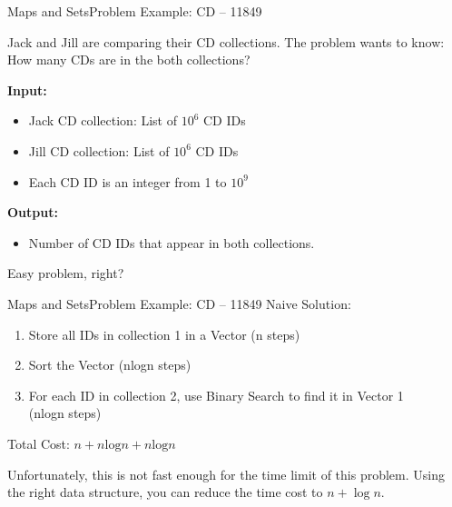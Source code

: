 \begin{frame}{Maps and Sets}{Problem Example: CD -- 11849}

  Jack and Jill are comparing their CD collections. The problem wants to know: How many CDs are in the both collections?\bigskip

  \begin{block}{}
    {\bf Input:}
    \begin{itemize}
    \item Jack CD collection: List of $10^6$ CD IDs
    \item Jill CD collection: List of $10^6$ CD IDs
    \item Each CD ID is an integer from 1 to $10^9$
    \end{itemize}

    {\bf Output:}
    \begin{itemize}
    \item Number of CD IDs that appear in both collections.
    \end{itemize}

  \end{block}
  \bigskip

  Easy problem, right?
\end{frame}

\begin{frame}{Maps and Sets}{Problem Example: CD -- 11849}
  Naive Solution:
  \bigskip

  \begin{enumerate}
  \item Store all IDs in collection 1 in a Vector \hfill (n steps)
  \item Sort the Vector \hfill (nlogn steps)
  \item For each ID in collection 2, use Binary Search to find it in Vector 1\\
  \hfill (nlogn steps)
  \end{enumerate}

  Total Cost: $n + n\text{log}n + n\text{log}n$
  \vspace{2cm}

  \begin{block}{}
  Unfortunately, this is not fast enough for the time limit of this problem. Using the right data structure, you can reduce the time cost to $n+\log n$.
  \end{block}
\end{frame}

